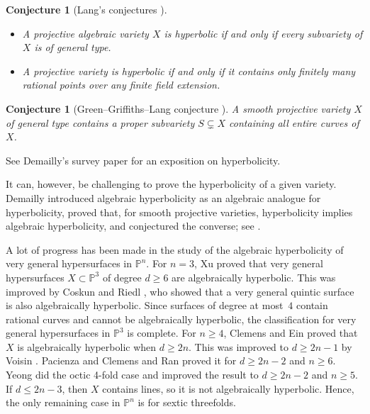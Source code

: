 \documentclass[11pt]{amsart}
\numberwithin{equation}{section}
\newtheorem{conjecture}[theorem]{Conjecture}
\theoremstyle{definition}
\theoremstyle{remark}
\renewcommand{\P}{\mathbb{P}}
\begin{document}
\begin{conjecture}[Lang's conjectures \cite{L86}]
  \leavevmode
    \begin{itemize} 
    \item A projective algebraic variety $X$ is hyperbolic if and only if every subvariety of $X$ is of general type.
    \item A projective variety is hyperbolic if and only if it contains only finitely many rational points over any finite field extension.
\end{itemize}
\end{conjecture}

\begin{conjecture}[Green--Griffiths--Lang conjecture \cite{GG80}]
    A smooth projective variety $X$ of general type contains a proper subvariety $S\subsetneq X$ containing all entire curves of $X$.
\end{conjecture}

See Demailly's survey paper \cite{De20} for an exposition on hyperbolicity.

It can, however, be challenging to prove the hyperbolicity of a given variety. Demailly introduced algebraic hyperbolicity as an algebraic analogue for hyperbolicity, proved that, for smooth projective varieties, hyperbolicity implies algebraic hyperbolicity, and conjectured the converse; see \cite{De95}.

A lot of progress has been made in the study of the algebraic hyperbolicity of very general hypersurfaces in $\P^n$. For $n=3$, Xu \cite{Xu94} proved that very general hypersurfaces $X\subset \P^3$ of degree $d\ge 6$ are algebraically hyperbolic. This was improved by Coskun and Riedl \cite{CR19a}, who showed that a very general quintic surface is also algebraically hyperbolic. Since surfaces of degree at most~$4$ contain rational curves and cannot be algebraically hyperbolic, the classification for very general hypersurfaces in $\P^3$ is complete. For $n\ge 4$, Clemens and Ein \cite{Cl86, Ei88} proved that $X$ is algebraically hyperbolic when $d\ge 2n$. This was improved to $d\ge 2n-1$ by Voisin \cite{Vo96, Vo98}. Pacienza \cite{Pa04} and Clemens and Ran \cite{ClR04} proved it for $d\ge 2n-2$ and $n\ge 6$. Yeong \cite{Y22} did the octic 4-fold case and improved the result to $d\ge 2n-2$ and $n\ge 5$. If $d\le 2n-3$, then $X$ contains lines, so it is not algebraically hyperbolic. Hence, the only remaining case in $\P^n$ is for sextic threefolds.
\end{document}
